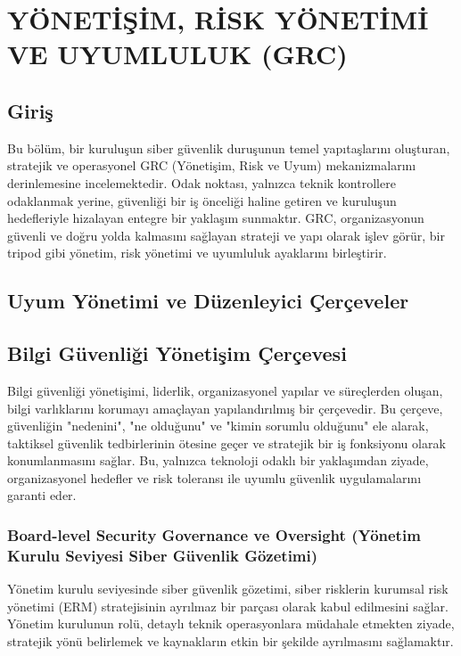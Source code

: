 \chapter{YÖNETİŞİM, RİSK YÖNETİMİ VE UYUMLULUK (GRC)}

\section*{Giriş}

Bu bölüm, bir kuruluşun siber güvenlik duruşunun temel yapıtaşlarını oluşturan, stratejik ve operasyonel GRC (Yönetişim, Risk ve Uyum) mekanizmalarını derinlemesine incelemektedir. Odak noktası, yalnızca teknik kontrollere odaklanmak yerine, güvenliği bir iş önceliği haline getiren ve kuruluşun hedefleriyle hizalayan entegre bir yaklaşım sunmaktır. GRC, organizasyonun güvenli ve doğru yolda kalmasını sağlayan strateji ve yapı olarak işlev görür, bir tripod gibi yönetim, risk yönetimi ve uyumluluk ayaklarını birleştirir.

\section{Uyum Yönetimi ve Düzenleyici Çerçeveler}

\section{Bilgi Güvenliği Yönetişim Çerçevesi}

Bilgi güvenliği yönetişimi, liderlik, organizasyonel yapılar ve süreçlerden oluşan, bilgi varlıklarını korumayı amaçlayan yapılandırılmış bir çerçevedir. Bu çerçeve, güvenliğin "nedenini", "ne olduğunu" ve "kimin sorumlu olduğunu" ele alarak, taktiksel güvenlik tedbirlerinin ötesine geçer ve stratejik bir iş fonksiyonu olarak konumlanmasını sağlar. Bu, yalnızca teknoloji odaklı bir yaklaşımdan ziyade, organizasyonel hedefler ve risk toleransı ile uyumlu güvenlik uygulamalarını garanti eder.

\subsection{Board-level Security Governance ve Oversight (Yönetim Kurulu Seviyesi Siber Güvenlik Gözetimi)}

Yönetim kurulu seviyesinde siber güvenlik gözetimi, siber risklerin kurumsal risk yönetimi (ERM) stratejisinin ayrılmaz bir parçası olarak kabul edilmesini sağlar. Yönetim kurulunun rolü, detaylı teknik operasyonlara müdahale etmekten ziyade, stratejik yönü belirlemek ve kaynakların etkin bir şekilde ayrılmasını sağlamaktır.

